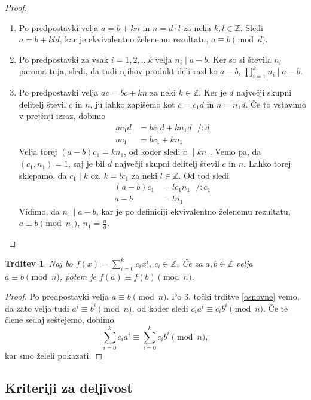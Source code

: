 \documentclass[12pt, a4paper]{article}
\newtheorem{trd}{Trditev}
\begin{document}
\begin{proof}
\begin{enumerate}
\item Po predpostavki velja $a=b+kn$ in $n=d\cdot l$ za neka $k,l\in \mathbb{Z}$. Sledi $a=b+kld$, kar je ekvivalentno želenemu rezultatu, $a\equiv b \pmod d$.
\item Po predpostavki za vsak $i=1,2,\ldots k$ velja $n_{i} \mid a-b$. Ker so si števila $n_{i}$ paroma tuja, sledi, da tudi njihov produkt deli razliko $a-b$, $\prod_{i=1}^{k} n_{i}\mid a-b$.
\item Po predpostavki velja $ac=bc+kn$ za neki $k\in \mathbb{Z}$. Ker je $d$ največji skupni delitelj števil $c$ in $n$, ju lahko zapišemo kot $c=c_{1}d$ in $n=n_{1}d$. Če to vstavimo v prejšnji izraz, dobimo
\begin{align*}
ac_{1}d&=bc_{1}d+kn_{1}d \ \ \ /:d \\
ac_{1}&= bc_{1} + kn_{1}
\end{align*}
Velja torej $(a-b)c_{1}=kn_{1}$, od koder sledi $c_{1}\mid kn_{1}$. Vemo pa, da $(c_{1},n_{1})=1$, saj je bil $d$ največji skupni delitelj števil $c$ in $n$. Lahko torej sklepamo, da $c_{1}\mid k$ oz. $k=lc_{1}$ za neki $l\in \mathbb{Z}$. Od tod sledi
\begin{align*}
(a-b)c_{1}&=lc_{1}n_{1} \ \ \ /:c_{1} \\
a-b&=ln_{1}
\end{align*}
Vidimo, da $n_{1}\mid a-b$, kar je po definiciji ekvivalentno želenemu rezultatu, $a\equiv b \pmod{n_{1}},\  n_{1}=\frac{n}{d}$.
\end{enumerate}
\end{proof}

\begin{trd}
Naj bo $f(x)=\sum_{i=0}^{k} c_{i}x^{i},\ c_{i}\in \mathbb{Z}$. Če za $a,b \in \mathbb{Z}$ velja $a\equiv b \pmod n$, potem je $f(a)\equiv f(b) \pmod n$.
\end{trd}

\begin{proof}
Po predpostavki velja $a\equiv b \pmod n$. Po 3. točki trditve \ref{osnovne} vemo, da zato velja tudi $a^{i}\equiv b^{i} \pmod n$, od koder sledi $c_{i}a^{i}\equiv c_{i}b^{i} \pmod n$. Če te člene sedaj seštejemo, dobimo
$$\sum_{i=0}^{k} c_{i}a^{i} \equiv \sum_{i=0}^{k} c_{i}b^{i} \pmod n,$$
kar smo želeli pokazati.
\end{proof}

\subsection{Kriteriji za deljivost}
\end{document}
